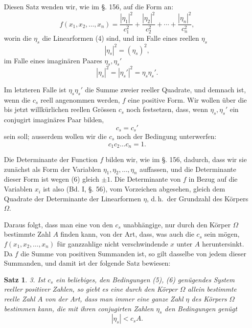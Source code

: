 \documentclass[12pt,a4paper]{article}
\newtheorem*{satz}{Satz}
\begin{document}
Diesen Satz wenden wir, wie im \S. 156, auf die Form an:
\[
f(x_1, x_2, \ldots, x_n) = \frac{|\eta_1|^2}{c_1^2} + \frac{|\eta_2|^2}{c_2^2} + \cdots + \frac{|\eta_n|^2}{c_n^2},
\]
worin die $\eta_s$ die Linearformen (4) sind, und im Falle eines reellen $\eta_s$
\[
|\eta_s|^2 = (\eta_s)^2,
\]
im Falle eines imaginären Paares $\eta_s, \eta_s'$
\[
|\eta_s|^2 = |\eta_s'|^2 = \eta_s\eta_s'.
\]

Im letzteren Falle ist $\eta_s\eta_s'$ die Summe zweier reeller Quadrate, und demnach ist, wenn die $c_s$ reell angenommen werden, $f$ eine positive Form. Wir wollen über die bis jetzt willkürlichen reellen Grössen $c_s$ noch festsetzen, dass, wenn $\eta_s, \eta_s'$ ein conjugirt imaginäres Paar bilden,
\begin{equation}\label{eq:185-5}
c_s = c_s'
\end{equation}
sein soll; ausserdem wollen wir die $c_s$ noch der Bedingung unterwerfen:
\begin{equation}\label{eq:185-6}
c_1 c_2 \ldots c_n = 1.
\end{equation}

Die Determinante der Function $f$ bilden wir, wie im \S. 156, dadurch, dass wir sie zunächst als Form der Variablen $\eta_1, \eta_2, \ldots, \eta_n$ auffassen, und die Determinante dieser Form ist wegen (6) gleich $\pm 1$. Die Determinante von $f$ in Bezug auf die Variablen $x_i$ ist also (Bd. I, \S. 56), vom Vorzeichen abgesehen, gleich dem Quadrate der Determinante der Linearformen $\eta$, d.\,h.\ der Grundzahl des Körpers $\Omega$.

Daraus folgt, dass man eine von den $c_s$ unabhängige, nur durch den Körper $\Omega$ bestimmte Zahl $A$ finden kann, von der Art, dass, was auch die $c_s$ sein mögen, $f(x_1, x_2, \ldots, x_n)$ für ganzzahlige nicht verschwindende $x$ unter $A$ heruntersinkt. Da $f$ die Summe von positiven Summanden ist, so gilt dasselbe von jedem dieser Summanden, und damit ist der folgende Satz bewiesen:

\begin{satz}
3. Ist $c_s$ ein beliebiges, den Bedingungen (5), (6) genügendes System reeller positiver Zahlen, so giebt es eine durch den Körper $\Omega$ allein bestimmte reelle Zahl $A$ von der Art, dass man immer eine ganze Zahl $\eta$ des Körpers $\Omega$ bestimmen kann, die mit ihren conjugirten Zahlen $\eta_s$ den Bedingungen genügt
\begin{equation}\label{eq:185-7}
|\eta_s| < c_s A.
\end{equation}
\end{satz}
\end{document}
